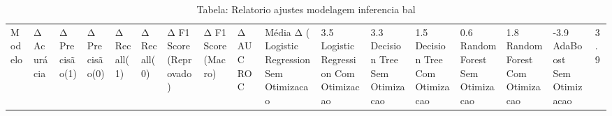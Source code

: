 \begin{table}[H] %
    \centering
    \caption{Tabela: Relatorio ajustes modelagem inferencia bal}
    \label{tab:relatorio_ajustes_modelagem_inferencia_bal}
    \renewcommand{\arraystretch}{1.25} %
    \begin{adjustwidth}{ -1in }{ -1in } %
    \centering %
    \small %
    \begin{tabular}{lllllllllll}
\toprule
                            Modelo & Δ Acurácia & Δ Precisão(1) & Δ Precisão(0) & Δ Recall(1) & Δ Recall(0) & Δ F1 Score (Reprovado) & Δ F1 Score (Macro) & Δ AUC ROC & Média Δ (%
\midrule
Logistic Regression Sem Otimizacao &       3.5%
Logistic Regression Com Otimizacao &       3.3%
      Decision Tree Sem Otimizacao &       1.5%
      Decision Tree Com Otimizacao &       0.6%
      Random Forest Sem Otimizacao &       1.8%
      Random Forest Com Otimizacao &      -3.9%
           AdaBoost Sem Otimizacao &       3.9%

\end{tabular}
\end{adjustwidth}
\end{table}
